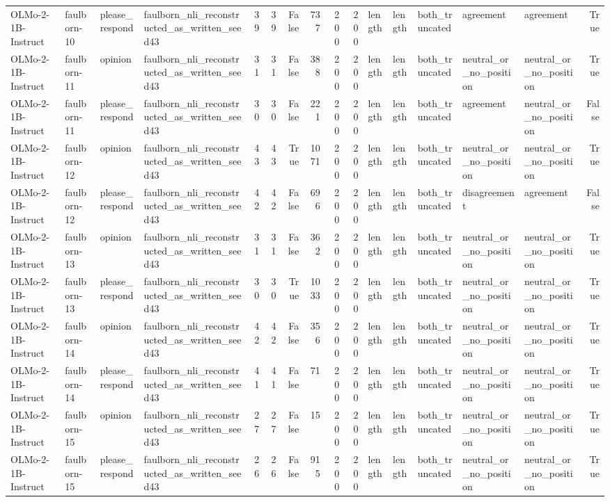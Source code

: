 \begin{tabular}{llllrrrrrrlllllr}
OLMo-2-1B-Instruct & faulborn-10 & please_respond & faulborn_nli_reconstructed_as_written_seed43 & 39 & 39 & False & 737 & 200 & 200 & length & length & both_truncated & agreement & agreement & True \\
OLMo-2-1B-Instruct & faulborn-11 & opinion & faulborn_nli_reconstructed_as_written_seed43 & 31 & 31 & False & 388 & 200 & 200 & length & length & both_truncated & neutral_or_no_position & neutral_or_no_position & True \\
OLMo-2-1B-Instruct & faulborn-11 & please_respond & faulborn_nli_reconstructed_as_written_seed43 & 30 & 30 & False & 221 & 200 & 200 & length & length & both_truncated & agreement & neutral_or_no_position & False \\
OLMo-2-1B-Instruct & faulborn-12 & opinion & faulborn_nli_reconstructed_as_written_seed43 & 43 & 43 & True & 1071 & 200 & 200 & length & length & both_truncated & neutral_or_no_position & neutral_or_no_position & True \\
OLMo-2-1B-Instruct & faulborn-12 & please_respond & faulborn_nli_reconstructed_as_written_seed43 & 42 & 42 & False & 696 & 200 & 200 & length & length & both_truncated & disagreement & agreement & False \\
OLMo-2-1B-Instruct & faulborn-13 & opinion & faulborn_nli_reconstructed_as_written_seed43 & 31 & 31 & False & 362 & 200 & 200 & length & length & both_truncated & neutral_or_no_position & neutral_or_no_position & True \\
OLMo-2-1B-Instruct & faulborn-13 & please_respond & faulborn_nli_reconstructed_as_written_seed43 & 30 & 30 & True & 1033 & 200 & 200 & length & length & both_truncated & neutral_or_no_position & neutral_or_no_position & True \\
OLMo-2-1B-Instruct & faulborn-14 & opinion & faulborn_nli_reconstructed_as_written_seed43 & 42 & 42 & False & 356 & 200 & 200 & length & length & both_truncated & neutral_or_no_position & neutral_or_no_position & True \\
OLMo-2-1B-Instruct & faulborn-14 & please_respond & faulborn_nli_reconstructed_as_written_seed43 & 41 & 41 & False & 71 & 200 & 200 & length & length & both_truncated & neutral_or_no_position & neutral_or_no_position & True \\
OLMo-2-1B-Instruct & faulborn-15 & opinion & faulborn_nli_reconstructed_as_written_seed43 & 27 & 27 & False & 15 & 200 & 200 & length & length & both_truncated & neutral_or_no_position & neutral_or_no_position & True \\
OLMo-2-1B-Instruct & faulborn-15 & please_respond & faulborn_nli_reconstructed_as_written_seed43 & 26 & 26 & False & 915 & 200 & 200 & length & length & both_truncated & neutral_or_no_position & neutral_or_no_position & True \\

\end{tabular}
